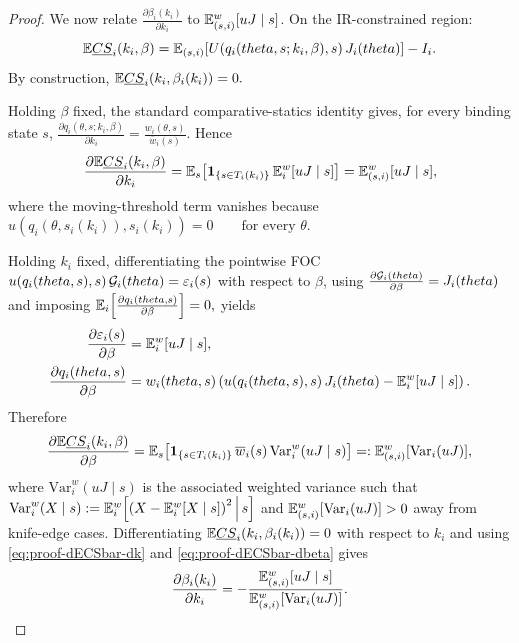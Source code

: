 \documentclass{class}
\begin{document}
\begin{proof}
We now relate $\frac{\partial \beta_i(k_i)}{\partial k_i}$ to $\mathbb{E}_{(s,i)}^w[uJ\mid s]$. On the IR-constrained region:
\[
\mathbb{E} \underline{CS}_i(k_i,\beta)
=
\mathbb{E}_{(s,i)}\!\left[ U\!\left(q_i(theta,s;k_i,\beta),s\right)J_i(theta)
\right]
-I_i.
\]
By construction,
$\mathbb{E} \underline{CS}_i\!\left(k_i,\beta_i(k_i)\right)=0.$

Holding $\beta$ fixed, the standard comparative-statics identity gives, for every binding state $s$,
$\frac{\partial q_i(\theta,s;k_i,\beta)}{\partial k_i} = \frac{w_i(\theta,s)}{\overline w_i(s)}.$
Hence
\begin{equation}\label{eq:proof-dECSbar-dk}
\frac{\partial  \mathbb{E} \underline{CS}_i(k_i,\beta)}{\partial k_i}
=
\mathbb{E}_s\!\left[
\mathbf 1_{\{s\in T_i(k_i)\}}
\,
\mathbb{E}_i^w[uJ\mid s]
\right]
=
\mathbb{E}_{(s,i)}^w[uJ\mid s],
\end{equation}
where the moving-threshold term vanishes because
$u\!\left(q_i(\theta,s_i(k_i)),s_i(k_i)\right)=0 \qquad \text{for every }\theta.$

Holding $k_i$ fixed, differentiating the pointwise FOC
$u\!\left(q_i(theta,s),s\right)\mathcal{G}_i(theta) = \varepsilon_i(s)$
with respect to $\beta$, using $\frac{\partial \mathcal{G}_i(theta)}{ \partial \beta }=J_i(theta)$ and imposing
$\mathbb{E}_i\!\left[ \frac{\partial q_i(theta,s)}{ \partial \beta } \right]=0,$
yields
\begin{align}
\frac{\partial \varepsilon_i(s)}{\partial \beta} &= \mathbb{E}_i^w[uJ\mid s], \label{eq:proof-deps-dbeta}\\
\frac{\partial q_i(theta,s)}{\partial \beta}
&=
w_i(theta,s)
\left(
u\!\left(q_i(theta,s),s\right)J_i(theta)
-
 \mathbb{E}_i^w[uJ\mid s]
\right). \label{eq:proof-dq-dbeta}
\end{align}
Therefore
\begin{equation}\label{eq:proof-dECSbar-dbeta}
\frac{\partial \mathbb{E} \underline{CS}_i(k_i,\beta)}{\partial \beta }
=
\mathbb{E}_s\!\left[
\mathbf 1_{\{s\in T_i(k_i)\}}
\,
\overline w_i(s)\,
\mathrm{Var}_i^w(uJ\mid s)
\right]
=:
\mathbb{E}_{(s,i)}^w[\mathrm{Var}_i(uJ)],
\end{equation}
where $\mathrm{Var}_i^w(uJ\mid s)$ is the associated weighted variance such that $\mathrm{Var}_i^w(X\mid s)
:=
\mathbb{E}_i^w\!\left[
\left(X-\mathbb{E}_i^w[X\mid s]\right)^2
\,\middle|\, s
\right]$ and $\mathbb{E}_{(s,i)}^w[\mathrm{Var}_i(uJ)]>0$ away from knife-edge cases. Differentiating
$\mathbb{E} \underline{CS}_i\!\left(k_i,\beta_i(k_i)\right)=0$
with respect to $k_i$ and using \ref{eq:proof-dECSbar-dk} and \ref{eq:proof-dECSbar-dbeta} gives
\begin{equation}\label{eq:proof-dbeta-dk}
\frac{\partial \beta_i(k_i)}{\partial k_i}
=
-\frac{\mathbb{E}_{(s,i)}^w[uJ\mid s]}{\mathbb{E}_{(s,i)}^w[\mathrm{Var}_i(uJ)]}.
\end{equation}


\end{proof}
\end{document}
